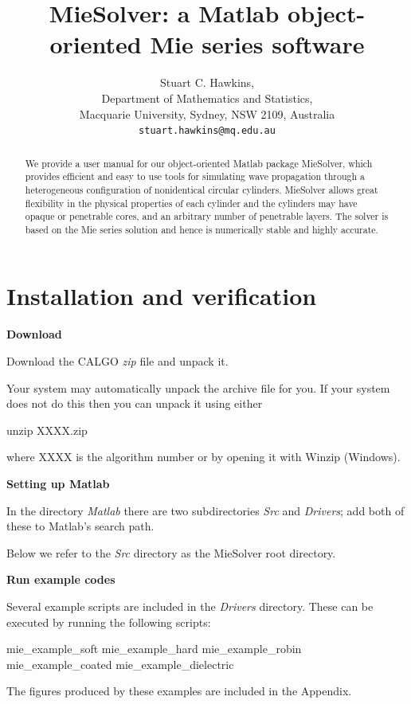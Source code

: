 \documentclass[11pt,letterpaper]{article}
\newcommand{\techheading}[1]{%
    \par\vspace{-0.3\parskip}\noindent\hspace{-1cm}\textbf{#1}%
    \par\vspace{-0.5\parskip}\noindent\nopagebreak\ignorespaces}
\begin{document}
\title{MieSolver: a Matlab object-oriented Mie series software}


\author{
Stuart C. Hawkins,\\ Department of Mathematics and Statistics,\\Macquarie University, Sydney, NSW 2109, Australia \\
{\tt stuart.hawkins@mq.edu.au}}
\date{}

\maketitle

\begin{abstract}
  We provide a user manual for our
  object-oriented Matlab package
  MieSolver, which provides efficient and easy to use tools
  for simulating wave propagation through a heterogeneous configuration
  of nonidentical circular cylinders.
  MieSolver allows great flexibility in the physical properties
  of each cylinder and the cylinders may have opaque or penetrable cores,
  and an arbitrary number of penetrable layers.
  The solver is based on the Mie series solution and hence is numerically
  stable and highly accurate.
\end{abstract}

\section{Installation  and verification}

\techheading{Download}
Download the CALGO \textit{zip} file and unpack it.

Your system may automatically unpack the archive file for you.
If your system does not do this then you can unpack it
using either 

unzip XXXX.zip

\noindent
where XXXX is the algorithm number
or by opening it with Winzip (Windows).

\techheading{Setting up Matlab}
In the directory \textit{Matlab} there are two subdirectories \textit{Src} and \textit{Drivers}; add both of these to Matlab's search path.

Below we refer to the \textit{Src} directory as the MieSolver root directory.

\techheading{Run example codes}
Several example scripts are included in the \textit{Drivers} directory.
These can be executed by running the following scripts:
\begin{matlab}
mie_example_soft
mie_example_hard
mie_example_robin
mie_example_coated
mie_example_dielectric
\end{matlab}
The figures produced by these examples are included in the Appendix.
\end{document}
